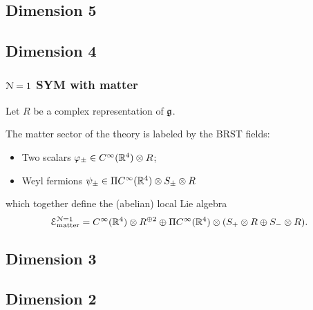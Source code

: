 \documentclass[10pt, oneside]{article}
\begin{document}


\subsection{Dimension 5}


\subsection{Dimension 4}


\subsubsection{$\mathcal N=1$ SYM with matter} 

Let $R$ be a complex representation of $\mathfrak{g}$.

The matter sector of the theory is labeled by the BRST fields:
\begin{itemize}
\item Two scalars $\varphi_{\pm} \in C^\infty (\mathbb R^4) \otimes R$;
\item Weyl fermions $\psi_{\pm} \in \Pi C^\infty(\mathbb R^4) \otimes S_{\pm} \otimes R$ 
\end{itemize} 
which together define the (abelian) local Lie algebra
\[
\mathcal E_{\rm matter}^{\mathcal N=1} = C^\infty (\mathbb R^4) \otimes R^{\oplus 2} \oplus  \Pi C^\infty(\mathbb R^4) \otimes (S_{+}  \otimes R \oplus S_- \otimes R) .
\]
\subsection{Dimension 3}


\subsection{Dimension 2}

\end{document}
